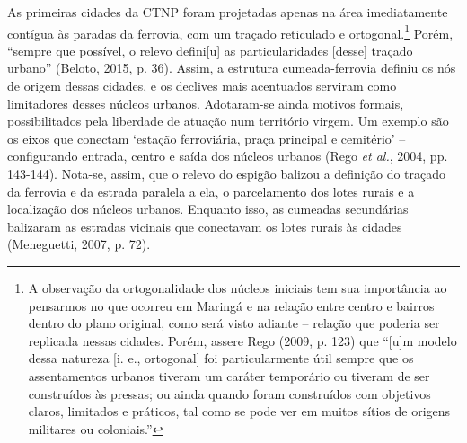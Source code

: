 \documentclass[12pt, a4paper]{book} %
\begin{document}
        As primeiras cidades da CTNP foram projetadas apenas na área imediatamente contígua às paradas da ferrovia, com um traçado reticulado e ortogonal.\footnote[94]{A observação da ortogonalidade dos núcleos iniciais tem sua importância ao pensarmos no que ocorreu em Maringá e na relação entre centro e bairros dentro do plano original, como será visto adiante – relação que poderia ser replicada nessas cidades. Porém, assere Rego (2009, p. 123) que ``[u]m modelo dessa natureza [i. e., ortogonal] foi particularmente útil sempre que os assentamentos urbanos tiveram um caráter temporário ou tiveram de ser construídos às pressas; ou ainda quando foram construídos com objetivos claros, limitados e práticos, tal como se pode ver em muitos sítios de origens militares ou coloniais.''} Porém, ``sempre que possível, o relevo defini[u] as particularidades [desse] traçado urbano'' (Beloto, 2015, p. 36). Assim, a estrutura cumeada-ferrovia definiu os nós de origem dessas cidades, e os declives mais acentuados serviram como limitadores desses núcleos urbanos. Adotaram-se ainda motivos formais, possibilitados pela liberdade de atuação num território virgem. Um exemplo são os eixos que conectam `estação ferroviária, praça principal e cemitério' – configurando entrada, centro e saída dos núcleos urbanos (Rego \textit{et al.}, 2004, pp. 143-144). Nota-se, assim, que o relevo do espigão balizou a definição do traçado da ferrovia e da estrada paralela a ela, o parcelamento dos lotes rurais e a localização dos núcleos urbanos. Enquanto isso, as cumeadas secundárias balizaram as estradas vicinais que conectavam os lotes rurais às cidades (Meneguetti, 2007, p. 72).%

       
\end{document}

